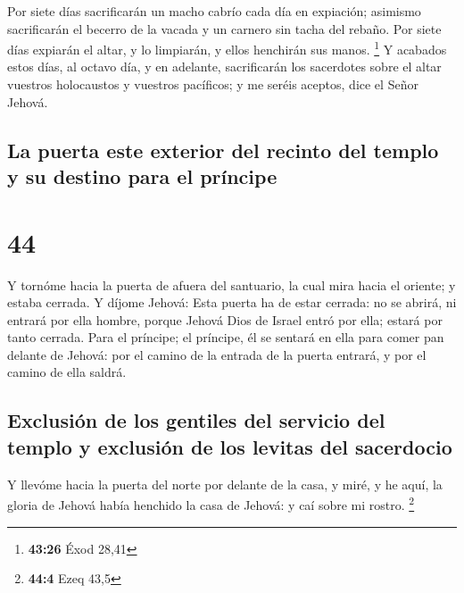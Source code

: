  Por siete días sacrificarán un macho cabrío cada día en
expiación; asimismo sacrificarán el becerro de la vacada y un carnero
sin tacha del rebaño.  Por siete días expiarán el altar,
y lo limpiarán, y ellos henchirán sus manos. \footnote{\textbf{43:26}
  Éxod 28,41}  Y acabados estos días, al octavo día, y en
adelante, sacrificarán los sacerdotes sobre el altar vuestros
holocaustos y vuestros pacíficos; y me seréis aceptos, dice el Señor
Jehová.

\hypertarget{la-puerta-este-exterior-del-recinto-del-templo-y-su-destino-para-el-pruxedncipe}{%
\subsection{La puerta este exterior del recinto del templo y su destino
para el
príncipe}\label{la-puerta-este-exterior-del-recinto-del-templo-y-su-destino-para-el-pruxedncipe}}

\hypertarget{section-43}{%
\section{44}\label{section-43}}

 Y tornóme hacia la puerta de afuera del santuario, la
cual mira hacia el oriente; y estaba cerrada.  Y díjome
Jehová: Esta puerta ha de estar cerrada: no se abrirá, ni entrará por
ella hombre, porque Jehová Dios de Israel entró por ella; estará por
tanto cerrada.  Para el príncipe; el príncipe, él se
sentará en ella para comer pan delante de Jehová: por el camino de la
entrada de la puerta entrará, y por el camino de ella saldrá.

\hypertarget{exclusiuxf3n-de-los-gentiles-del-servicio-del-templo-y-exclusiuxf3n-de-los-levitas-del-sacerdocio}{%
\subsection{Exclusión de los gentiles del servicio del templo y
exclusión de los levitas del
sacerdocio}\label{exclusiuxf3n-de-los-gentiles-del-servicio-del-templo-y-exclusiuxf3n-de-los-levitas-del-sacerdocio}}

 Y llevóme hacia la puerta del norte por delante de la
casa, y miré, y he aquí, la gloria de Jehová había henchido la casa de
Jehová: y caí sobre mi rostro. \footnote{\textbf{44:4} Ezeq 43,5}

